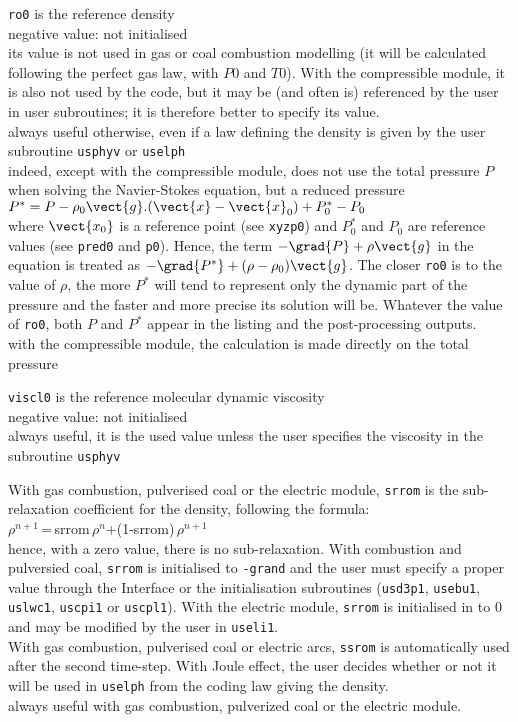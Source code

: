 {{\tt ro0} is the reference density\\
negative value: not initialised\\
its value is not used in gas or coal combustion modelling (it
will be calculated following the perfect gas law, with $P0$ and $T0$). With the
compressible module, it is also not used by the code, but it may be (and often
is) referenced by the user in user subroutines; it is therefore better to
specify its value.\\
always useful otherwise, even if a law defining the density is given by
the user subroutine \texttt{usphyv} or \texttt{uselph}\\
indeed, except with the
compressible module, \CS does not
use the total pressure $P$ when solving the Navier-Stokes equation, but a
reduced pressure \\
$P^*=P-\rho_0\vect{g}.(\vect{x}-\vect{x}_0)+P^*_0-P_0$\\
where
$\vect{x_0}$ is a reference point (see {\tt xyzp0}) and $P^*_0$ and $P_0$ are
reference values (see {\tt pred0} and {\tt p0}). Hence, the term
$-\grad{P}+\rho\vect{g}$ in the equation is treated as
$-\grad{P^*}+(\rho-\rho_0)\vect{g}$. The closer {\tt ro0} is to the value of $\rho$,
the more $P^*$ will tend to represent only the dynamic part of the pressure and
the faster and more precise its solution will be. Whatever the value of {\tt ro0},
both $P$ and $P^*$ appear in the listing and the post-processing outputs.\\
with the compressible module, the calculation is made directly on the total
pressure}

{ {\tt viscl0} is the reference molecular dynamic
viscosity\\
negative value: not initialised\\
always useful, it is the used value unless the user specifies the
viscosity in the subroutine \texttt{usphyv}}

{With gas combustion, pulverised coal or the electric module, {\tt srrom}
 is the sub-relaxation coefficient for the density, following the formula:\\
$\rho^{n+1}$\,=\,srrom\,$\rho^n$+(1-srrom)\,$\rho^{n+1}$\\
hence, with a zero value, there is no sub-relaxation.
With combustion and pulversied coal, {\tt srrom} is initialised to {\tt -grand}
and the user must specify a proper value through the Interface or the
initialisation subroutines (\texttt{usd3p1},
 \texttt{usebu1}, \texttt{uslwc1}, \texttt{uscpi1} or
\texttt{uscpl1}). With the electric module, {\tt srrom} is initialised in to 0
and may be modified by the user in \texttt{useli1}.\\
With gas combustion, pulverised coal or electric arcs, {\tt ssrom} is
automatically used after the second time-step. With Joule effect,
the user decides whether or not it will be used in \texttt{uselph}
from the coding law giving the density.}\\
always useful with gas combustion, pulverized coal or the electric module.

